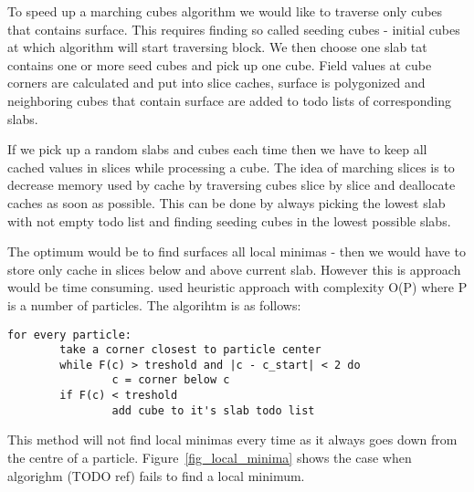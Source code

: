 To speed up a marching cubes algorithm we would like to traverse only cubes that contains surface. This requires finding so called seeding cubes - initial cubes at which algorithm will start traversing block. We then choose one slab tat contains one or more seed cubes and pick up one cube. Field values at cube corners are calculated and put into slice caches, surface is polygonized and neighboring cubes that contain surface are added to todo lists of corresponding slabs. 

If we pick up a random slabs and cubes each time then we have to keep all cached values in slices while processing a cube. The idea of marching slices is to decrease memory used by cache by traversing cubes slice by slice and deallocate caches as soon as possible. This can be done by always picking the lowest slab with not empty todo list and finding seeding cubes in the lowest possible slabs. 

The optimum would be to find surfaces all local minimas - then we would have to store only cache in slices below and above current slab. However this is approach would be time consuming. \cite{RosenbergBirdwell2008} used heuristic approach with complexity O(P) where P is a number of particles. The algorihtm is as follows:
\begin{verbatim}
for every particle:
        take a corner closest to particle center
        while F(c) > treshold and |c - c_start| < 2 do
                c = corner below c
        if F(c) < treshold
                add cube to it's slab todo list
\end{verbatim}

This method will not find local minimas every time as it always goes down from the centre of a particle. Figure~\ref{fig_local_minima} shows the case when algorighm (TODO ref) fails to find a local minimum. 



